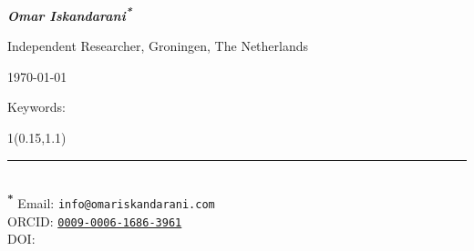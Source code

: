 \documentclass[11pt]{article}
\begin{document}
    \thispagestyle{empty}%
    \begin{center}
        \Large \bfseries \papertitle \par \vspace{1cm}
        {\Large \itshape \textbf{Omar Iskandarani}\textsuperscript{\textbf{*}} \par} \vspace{0.5cm}
        {\small Independent Researcher, Groningen, The Netherlands\par} \vspace{0.5cm}
        {\today \par}  \vspace{0.5cm}
    \end{center}
    
    \begin{abstract}
        
        Abstract text here
        
    \end{abstract}
    Keywords: \paperkeywords


    \begin{textblock*}{1\textwidth}(0.15\textwidth,1.1\textheight)\raggedright\footnotesize\renewcommand{\arraystretch}{1.0} \noindent\rule{\textwidth}{0.4pt}\\[0.5em]
        \textsuperscript{\textbf{*}} Email: \texttt{info@omariskandarani.com}\\  
        ORCID: \texttt{\href{https://orcid.org/0009-0006-1686-3961}{0009-0006-1686-3961}}\\
        DOI: \href{https://doi.org/\paperdoi}{\paperdoi}    
    \end{textblock*}
    
    
    
    
    
\end{document}
